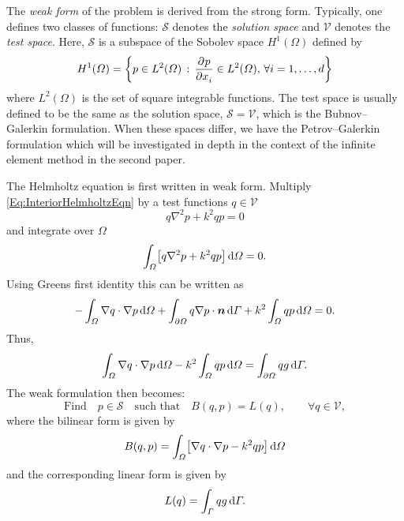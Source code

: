 The \textit{weak form} of the problem is derived from the strong form. Typically, one defines two classes of functions: $\mathcal{S}$ denotes the \textit{solution space} and $\mathcal{V}$ denotes the \textit{test space}. Here, $\mathcal{S}$ is a subspace of the Sobolev space $H^1(\Omega)$ defined by
\begin{equation*}
	H^1(\Omega) = \left\{p\in L^2(\Omega)\st \pderiv{p}{x_i}\in L^2(\Omega),\,\forall i=1,\dots,d\right\}
\end{equation*}
where $L^2(\Omega)$ is the set of square integrable functions. The test space is usually defined to be the same as the solution space, $\mathcal{S} = \mathcal{V}$, which is the Bubnov--Galerkin formulation. When these spaces differ, we have the Petrov--Galerkin formulation which will be investigated in depth in the context of the infinite element method in the second paper.

The Helmholtz equation is first written in weak form. Multiply \eqref{Eq:InteriorHelmholtzEqn} by a test functions $q\in\mathcal{V}$
\begin{equation*}
	q\nabla^2 p + k^2 qp = 0
\end{equation*}
and integrate over $\Omega$
\begin{equation*}
	\int_{\Omega} \left[q\nabla^2 p + k^2 qp\right]\idiff \Omega = 0.
\end{equation*}
Using Greens first identity this can be written as
\begin{equation*}
	-\int_{\Omega} \nabla q\cdot\nabla p\idiff\Omega + \int_{\partial\Omega} q\nabla p\cdot\vec{n}\idiff\Gamma + k^2\int_{\Omega}  qp\idiff \Omega = 0.
\end{equation*}
Thus,
\begin{equation}\label{Eq:weakformulationHelmholtz}
	\int_{\Omega} \nabla q\cdot\nabla p\, \mathrm{d}\Omega -  k^2\int_{\Omega}qp\, \mathrm{d}\Omega = \int_{\partial\Omega} q g\, \mathrm{d}\Gamma.
\end{equation}
The weak formulation then becomes: 
\begin{equation}
	\text{Find} \quad p\in \mathcal{S}\quad\text{such that}\quad B(q,p) = L(q),\qquad \forall q\in \mathcal{V},
\end{equation}
where the bilinear form is given by
\begin{equation}\label{Eq:BilinearForm}
	B(q,p) = \int_{\Omega} \left[\nabla q\cdot\nabla p-  k^2qp\right]\idiff\Omega
\end{equation}
and the corresponding linear form is given by
\begin{equation*}
	L(q) = \int_{\Gamma} qg\, \mathrm{d}\Gamma.
\end{equation*}


